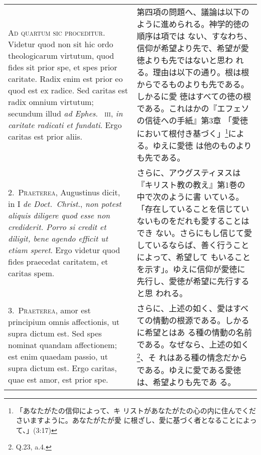\documentclass[10pt]{jsarticle}
\begin{document}
\begin{longtable}{p{21em}p{21em}}

{\scshape Ad quartum sic proceditur}. Videtur quod non sit hic ordo
theologicarum virtutum, quod fides sit prior spe, et spes prior
caritate. Radix enim est prior eo quod est ex radice. Sed caritas est
radix omnium virtutum; secundum illud {\itshape ad Ephes}.~{\scshape
iii}, {\itshape in caritate radicati et fundati}. Ergo caritas est
prior aliis.


&

 第四項の問題へ、議論は以下のように進められる。神学的徳の順序は項では
 ない、すなわち、信仰が希望より先で、希望が愛徳よりも先ではないと思わ
 れる。理由は以下の通り。根は根からでるものよりも先である。しかるに愛
 徳はすべての徳の根である。これはかの『エフェソの信徒への手紙』第3章
 「愛徳において根付き基づく」\footnote{「あなたがたの信仰によって、キ
 リストがあなたがたの心の内に住んでくださいますように。あなたがたが愛
 に根ざし、愛に基づく者となることによって、」(3:17)}による。ゆえに愛徳
 は他のものよりも先である。

 \\



2.~{\scshape Praeterea}, Augustinus dicit, in I {\itshape de
Doct.~Christ}., {\itshape non potest aliquis diligere quod esse non
crediderit. Porro si credit et diligit, bene agendo efficit ut etiam
speret}. Ergo videtur quod fides praecedat caritatem, et caritas spem.


&

さらに、アウグスティヌスは『キリスト教の教え』第1巻の中で次のように書
いている。「存在していることを信じていないものをだれも愛することはでき
ない。さらにもし信じて愛しているならば、善く行うことによって、希望して
もいることを示す」。ゆえに信仰が愛徳に先行し、愛徳が希望に先行すると思
われる。

 \\



3.~{\scshape Praeterea}, amor est principium omnis affectionis, ut
supra dictum est. Sed spes nominat quandam affectionem; est enim
quaedam passio, ut supra dictum est. Ergo caritas, quae est amor, est
prior spe.


&

 さらに、上述の如く、愛はすべての情動の根源である。しかるに希望とはあ
 る種の情動の名前である。なぜなら、上述の如く\footnote{Q.23, a.4.}、そ
 れはある種の情念だからである。ゆえに愛である愛徳は、希望よりも先であ
 る。



\end{longtable}
\end{document}
